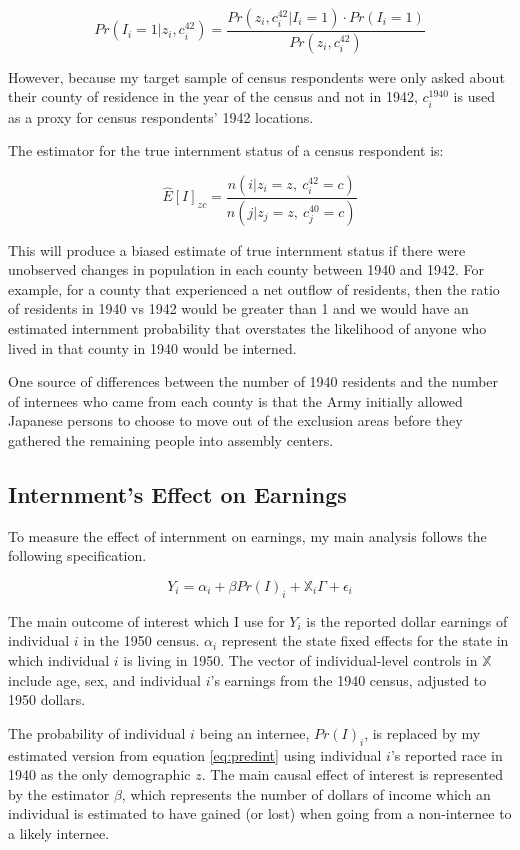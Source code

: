 $$Pr(I_i=1|z_i,c_i^{42}) = \frac{Pr(z_i,c_i^{42}|I_i=1) \cdot Pr(I_i=1)}{Pr(z_i,c_i^{42})}$$

However, because my target sample of census respondents were only asked about their county of residence in the year of the census and not in 1942, $c_i^{1940}$ is used as a proxy for census respondents' 1942 locations.

The estimator for the true internment status of a census respondent is:

\begin{equation}\label{eq:predint}
\hat{E}[I]_{zc} =
\frac{n(i | z_i=z, ~ c_{i}^{42}=c)}{n(j | z_j=z, ~ c_{j}^{40}=c)}
\end{equation}

This will produce a biased estimate of true internment status if there were unobserved changes in population in each county between 1940 and 1942. For example, for a county that experienced a net outflow of residents, then the ratio of residents in 1940 vs 1942 would be greater than 1 and we would have an estimated internment probability that overstates the likelihood of anyone who lived in that county in 1940 would be interned.

One source of differences between the number of 1940 residents and the number of internees who came from each county is that the Army initially allowed Japanese persons to choose to move out of the exclusion areas before they gathered the remaining people into assembly centers.

\subsection{Internment's Effect on Earnings}

To measure the effect of internment on earnings, my main analysis follows the following specification.

\begin{equation}\label{eq:mainreg}
  Y_i = \alpha_i + \beta Pr(I)_i + \mathbb{X}_i \Gamma + \epsilon_i
\end{equation}

The main outcome of interest which I use for $Y_i$ is the reported dollar earnings of individual $i$ in the 1950 census.
$\alpha_i$ represent the state fixed effects for the state in which individual $i$ is living in 1950.
The vector of individual-level controls in $\mathbb{X}$ include age, sex, and individual $i$'s earnings from the 1940 census,
adjusted to 1950 dollars.

The probability of individual $i$ being an internee, $Pr(I)_i$,
is replaced by my estimated version from equation \ref{eq:predint}
using individual $i$'s reported race in 1940 as the only demographic $z$.
The main causal effect of interest is represented by the estimator $\beta$,
which represents the number of dollars of income which an individual is estimated to have gained (or lost)
when going from a non-internee to a likely internee.